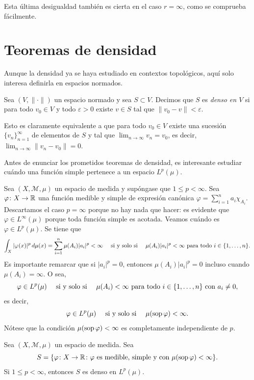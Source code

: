 \documentclass[a4paper, 11pt, oneside]{report}
\begin{document}
Esta última desigualdad también es cierta en el caso $r=\infty$, como se comprueba fácilmente.

\section{Teoremas de densidad}

Aunque la densidad ya se haya estudiado en contextos topológicos, aquí solo interesa definirla en espacios normados.

\begin{definition}
  Sea $(V,\|\cdot\|)$ un espacio normado y sea $S \subset V$. Decimos que $S$ es \emph{denso en $V$} si para todo $v_0 \in V$ y todo $\varepsilon>0$ existe $v \in S$ tal que $\|v_0-v\|<\varepsilon$.
\end{definition}

Esto es claramente equivalente a que para todo $v_0 \in V$ existe una sucesión $\{v_n\}_{n=1}^\infty$ de elementos de $S$ y tal que $\lim_{n \to \infty} v_n = v_0$, es decir, $\lim_{n \to \infty} \|v_n-v_0\| = 0$.

Antes de enunciar los prometidos teoremas de densidad, es interesante estudiar cuándo una función simple pertenece a un espacio $L^p(\mu)$.

Sea $(X,\mathcal{M},\mu)$ un espacio de medida y supóngase que $1 \leq p < \infty$. Sea $\varphi \colon X \to \mathbb R$ una función medible y simple de expresión canónica $\varphi = \sum_{i=1}^n a_i \chi_{A_i}$. Descartamos el caso $p = \infty$ porque no hay nada que hacer: es evidente que $\varphi \in L^\infty(\mu)$ porque toda función simple es acotada. Veamos cuándo es $\varphi \in L^p(\mu)$. Se tiene que
\[\int_X |\varphi(x)|^p \, d\mu(x) = \sum_{i=1}^n \mu(A_i)|a_i|^p < \infty \quad \textup{ si y solo si } \quad \mu(A_i)|a_i|^p < \infty \textup{ para todo } i \in \{1,\mathellipsis,n\}.\]
Es importante remarcar que si $|a_i|^p = 0$, entonces $\mu(A_i)|a_i|^p = 0$ incluso cuando $\mu(A_i) = \infty$. O sea,
\[\varphi \in L^p(\mu) \quad \textup{ si y solo si } \quad \mu(A_i) < \infty \textup{ para todo } i \in \{1,\mathellipsis,n\} \textup{ con } a_i \neq 0,\]
es decir,
\[\varphi \in L^p(\mu) \quad \textup{ si y solo si } \quad \mu(\textup{sop}\, \varphi) < \infty.\]
Nótese que la condición $\mu(\textup{sop}\, \varphi) < \infty$ es completamente independiente de $p$.

\begin{theorem}
  Sea $(X,\mathcal{M},\mu)$ un espacio de medida. Sea
  \[S = \{\varphi \colon X \to \mathbb R \colon \varphi \textup{ es medible, simple y con } \mu(\textup{sop}\, \varphi) < \infty\}.\]
  Si $1 \leq p < \infty$, entonces $S$ es denso en $L^p(\mu)$.
\end{theorem}
\end{document}
